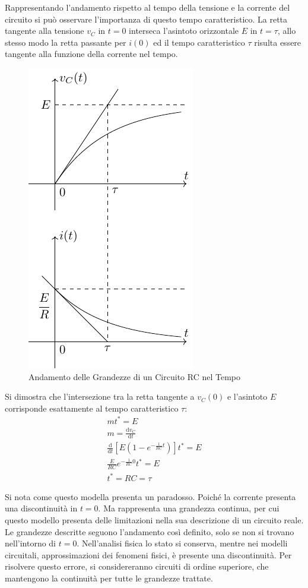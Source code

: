 \documentclass{article}
\newcommand{\df}{\mathrm{d}}
\numberwithin{equation}{subsection}
\begin{document}
Rappresentando l'andamento rispetto al tempo della tensione e la corrente del circuito si può osservare l'importanza di questo tempo caratteristico. La retta tangente alla tensione 
$v_C$ in $t=0$ interseca l'asintoto orizzontale $E$ in $t=\tau$, allo stesso modo la retta passante per $i(0)$ ed il tempo caratteristico $\tau$ risulta essere tangente alla 
funzione della corrente nel tempo. 
\begin{figure}[H]%
    \centering
    \includegraphics{andamento-circuito-rc.pdf}
    \caption{Andamento delle Grandezze di un Circuito RC nel Tempo}
    \label{fig:andamento-rc}
\end{figure}

Si dimostra che l'intersezione tra la retta tangente a $v_C(0)$ e l'asintoto $E$ corrisponde esattamente al tempo caratteristico $\tau$:
\begin{gather*}
    mt^*=E\\
    m=\displaystyle\frac{\df v_C}{\df t}\\
    \displaystyle\frac{\df}{\df t}\left[E\left(1-e^{-\frac{1}{RC}t}\right)\right]t^*=E\\
    \displaystyle\frac{E}{RC}e^{-\frac{1}{RC}0}t^*=E\\
    t^*=RC=\tau
\end{gather*}


Si nota come questo modella presenta un paradosso. Poiché la corrente presenta una discontinuità in $t=0$. Ma rappresenta una grandezza continua, per cui questo modello 
presenta delle limitazioni nella sua descrizione di un circuito reale. Le grandezze descritte seguono l'andamento così definito, solo se non si trovano nell'intorno di $t=0$. 
Nell'analisi fisica lo stato si conserva, mentre nei modelli circuitali, approssimazioni dei fenomeni fisici, è presente una discontinuità. Per risolvere questo errore, si 
considereranno circuiti di ordine superiore, che mantengono la continuità per tutte le grandezze trattate. 
\end{document}
